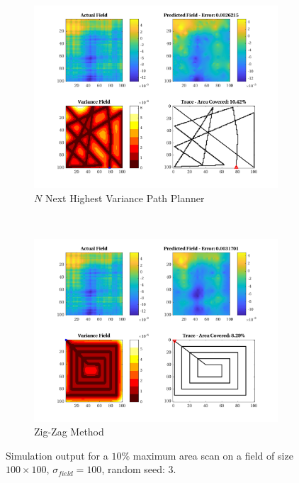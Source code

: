 \begin{figure}[htb!]
\begin{subfigure}[t]{0.5\textwidth}
    \end{subfigure}%
    \\
    \begin{subfigure}[t]{0.5\textwidth}
        \centering
        \includegraphics[width=\linewidth]{figures/hbresults/nnhv_10p_100x100_sf_100_seed_3.png}
        \captionsetup{skip=0.10\baselineskip,size=footnotesize}
        \caption{$N$ Next Highest Variance Path Planner}
    \end{subfigure}%
    ~
    \begin{subfigure}[t]{0.5\textwidth}
        \centering
        \includegraphics[width=\linewidth]{figures/hbresults/zz_10p_100x100_sf_100_seed_3.png}
        \captionsetup{skip=0.10\baselineskip,size=footnotesize}
        \caption{Zig-Zag Method}
    \end{subfigure}%
    \captionsetup{skip=0.20\baselineskip}
    \caption{Simulation output for a $10\%$ maximum area scan on a field of size $100 \times 100$, $\sigma_{field} = 100$, random seed: 3.}
    \label{fig:sim_sigma100_p10_s3}
\end{figure}

